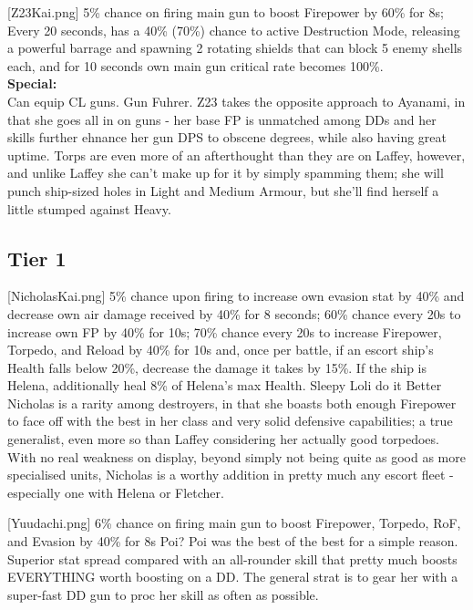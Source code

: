 [Z23Kai.png]
{5\% chance on firing main gun to boost Firepower by 60\% for 8s; Every 20 seconds, has a 40\% (70\%) chance to active Destruction Mode, releasing a powerful barrage and spawning 2 rotating shields that can block 5 enemy shells each, and for 10 seconds own main gun critical rate becomes 100\%.\\\textbf{Special:}\\ Can equip CL guns.}
{Gun Fuhrer.}
{Z23 takes the opposite approach to Ayanami, in that she goes all in on guns - her base FP is unmatched among DDs and her skills further ehnance her gun DPS to obscene degrees, while also having great uptime.
Torps are even more of an afterthought than they are on Laffey, however, and unlike Laffey she can't make up for it by simply spamming them; she will punch ship-sized holes in Light and Medium Armour, but she'll find herself a little stumped against Heavy.}


\newpage
\subsection{Tier 1}

[NicholasKai.png]
{5\% chance upon firing to increase own evasion stat by 40\% and decrease own air damage received by 40\% for 8 seconds; 60\% chance every 20s to increase own FP by 40\% for 10s; 70\% chance every 20s to increase Firepower, Torpedo, and Reload by 40\% for 10s and, once per battle, if an escort ship's Health falls below 20\%, decrease the damage it takes by 15\%. If the ship is Helena, additionally heal 8\% of Helena's max Health. }
{Sleepy Loli do it Better}
{Nicholas is a rarity among destroyers, in that she boasts both enough Firepower to face off with the best in her class and very solid defensive capabilities; a true generalist, even more so than Laffey considering her actually good torpedoes.
With no real weakness on display, beyond simply not being quite as good as more specialised units, Nicholas is a worthy addition in pretty much any escort fleet - especially one with Helena or Fletcher.}

[Yuudachi.png]
{6\% chance on firing main gun to boost Firepower, Torpedo, RoF, and Evasion by 40\% for 8s}
{Poi?}
{Poi was the best of the best for a simple reason. Superior stat spread compared with an all-rounder skill that pretty much boosts EVERYTHING worth boosting on a DD. The general strat is to gear her with a super-fast DD gun to proc her skill as often as possible.}

